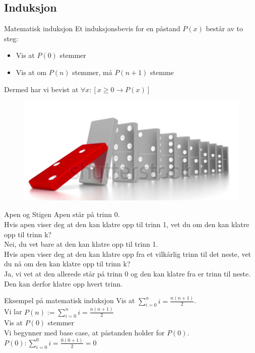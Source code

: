 \subsection{Induksjon}
\begin{frame}{Matematisk induksjon}
    Et induksjonsbevis for en påstand $P(x)$ består av to steg:\\
    \begin{itemize}
        \item Vis at $P(0)$ stemmer
        \item Vis at om $P(n)$ stemmer, må $P(n+1)$ stemme
    \end{itemize}
    Dermed har vi bevist at $\forall x : [ x \geq 0 \rightarrow P(x)]$
    
    \begin{figure}
        \centering
        \includegraphics[scale=0.1]{images/domino.PNG}
        \label{fig:my_label1}
    \end{figure}
\end{frame}

\begin{frame}{Apen og Stigen} %
    Apen står på trinn 0.\\
    
    Hvis apen viser deg at den kan klatre opp til trinn 1, vet du om den kan klatre opp til trinn k?\\
\pause
    Nei, du vet bare at den kan klatre opp til trinn 1.\\
    
\pause
    Hvis apen viser deg at den kan klatre opp fra et vilkårlig trinn til det neste, vet du nå om den kan klatre opp til trinn k?\\
\pause
    Ja, vi vet at den allerede står på trinn 0 og den kan klatre fra er trinn til neste. Den kan derfor klatre opp hvert trinn.
    
\end{frame}
\begin{frame}{Eksempel på matematisk induksjon}
    Vis at $\sum_{i=0}^{n} i = \frac{n(n+1)}{2}$.\\
\pause    
    Vi lar $P(n) := \sum_{i=0}^{n} i = \frac{n(n+1)}{2}$\\%
    
\pause 
    Vis at $P(0)$ stemmer\\
\pause
    Vi begynner med base case, at påstanden holder for $P(0)$.\\
    $P(0): \sum_{i=0}^{0} i = \frac{0(0+1)}{2} = 0$ \checkmark\\
\end{frame}

